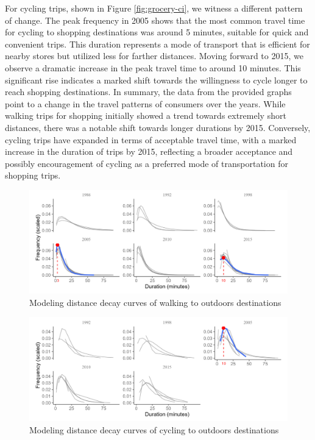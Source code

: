 \documentclass[12pt,twoside]{reedthesis}
\begin{document}
For cycling trips, shown in Figure \ref{fig:grocery-ci}, we witness a different pattern of change. The peak frequency in 2005 shows that the most common travel time for cycling to shopping destinations was around 5 minutes, suitable for quick and convenient trips. This duration represents a mode of transport that is efficient for nearby stores but utilized less for farther distances. Moving forward to 2015, we observe a dramatic increase in the peak travel time to around 10 minutes. This significant rise indicates a marked shift towards the willingness to cycle longer to reach shopping destinations.
In summary, the data from the provided graphs point to a change in the travel patterns of consumers over the years. While walking trips for shopping initially showed a trend towards extremely short distances, there was a notable shift towards longer durations by 2015. Conversely, cycling trips have expanded in terms of acceptable travel time, with a marked increase in the duration of trips by 2015, reflecting a broader acceptance and possibly encouragement of cycling as a preferred mode of transportation for shopping trips.

\newpage
\thispagestyle{empty}
\begin{landscape}
\begin{figure}

{\centering \includegraphics[width=0.9\linewidth]{outdoors-wi} 

}

\caption{Modeling distance decay curves of walking to outdoors destinations}\label{fig:outdoors-wi}
\end{figure}
\begin{figure}

{\centering \includegraphics[width=0.9\linewidth]{outdoors-ci} 

}

\caption{Modeling distance decay curves of cycling to outdoors destinations}\label{fig:outdoors-ci}
\end{figure}
\end{landscape}
\clearpage
\end{document}
